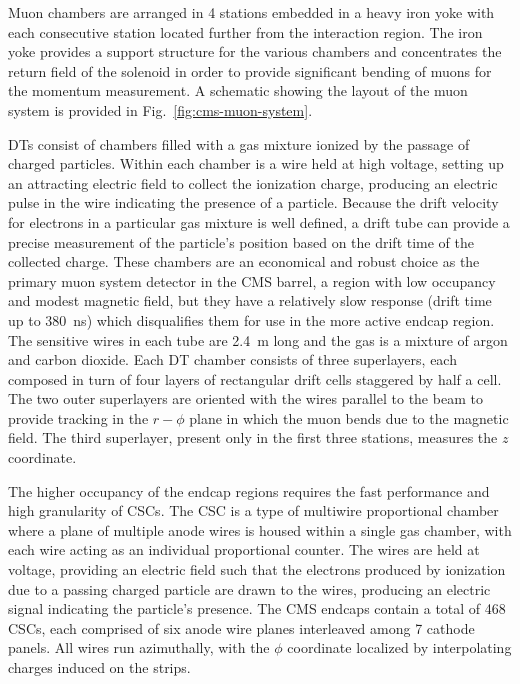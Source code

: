 Muon chambers are arranged in 4 stations embedded in a heavy iron yoke with each consecutive station located further from the interaction region.  The iron yoke provides a support structure for the various chambers and concentrates the return field of the solenoid in order to provide significant bending of muons for the momentum measurement.  A schematic showing the layout of the muon system is provided in Fig.~\ref{fig:cms-muon-system}.

DTs consist of chambers filled with a gas mixture ionized by the passage of charged particles.  Within each chamber is a wire held at high voltage, setting up an attracting electric field to collect the ionization charge, producing an electric pulse in the wire indicating the presence of a particle.  Because the drift velocity for electrons in a particular gas mixture is well defined, a drift tube can provide a precise measurement of the particle's position based on the drift time of the collected charge. These chambers are an economical and robust choice as the primary muon system detector in the CMS barrel, a region with low occupancy and modest magnetic field, but they have a relatively slow response (drift time up to \SI{380}{ns}) which disqualifies them for use in the more active endcap region.  The sensitive wires in each tube are \SI{2.4}{m} long and the gas is a mixture of argon and carbon dioxide.  Each DT chamber consists of three superlayers, each composed in turn of four layers of rectangular drift cells staggered by half a cell.  The two outer superlayers are oriented with the wires parallel to the beam to provide tracking in the $r-\phi$ plane in which the muon bends due to the magnetic field.  The third superlayer, present only in the first three stations, measures the $z$ coordinate.

The higher occupancy of the endcap regions requires the fast performance and high granularity of CSCs.  The CSC is a type of multiwire proportional chamber where a plane of multiple anode wires is housed within a single gas chamber, with each wire acting as an individual proportional counter.  The wires are held at voltage, providing an electric field such that the electrons produced by ionization due to a passing charged particle are drawn to the wires, producing an electric signal indicating the particle's presence.  The CMS endcaps contain a total of 468 CSCs, each comprised of six anode wire planes interleaved among 7 cathode panels.  All wires run azimuthally, with the $\phi$ coordinate localized by interpolating charges induced on the strips.  

